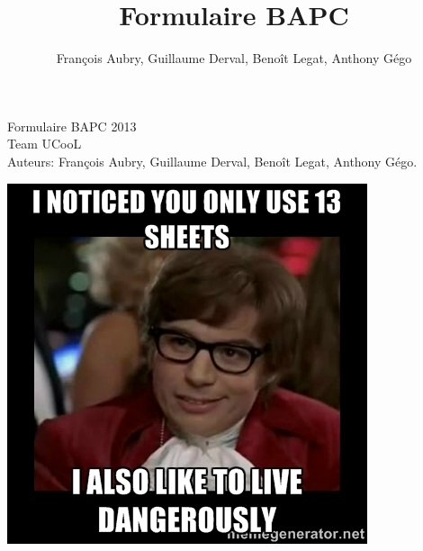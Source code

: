 \documentclass[2pt,a4paper]{article}
\author{François Aubry, Guillaume Derval, Benoît Legat, Anthony Gégo}
\title{Formulaire BAPC}
\begin{document}
\begin{multicols}{2}
{\Huge Formulaire BAPC 2013}\\
{\Large Team UCooL}\\
Auteurs: François Aubry, Guillaume Derval, Benoît Legat, Anthony Gégo.
\tableofcontents





\end{multicols}
\begin{center}
\includegraphics[scale=0.5]{dangerously.jpg}
\end{center}
\end{document}
